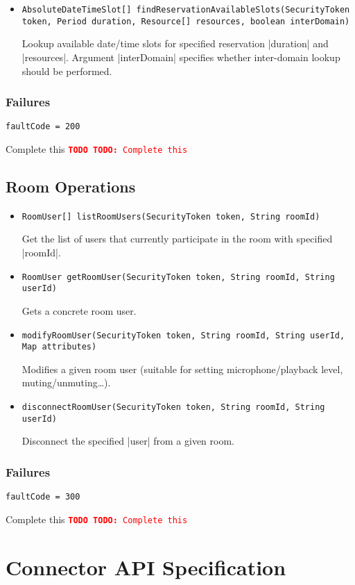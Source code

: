 \documentclass[a4paper]{report}
\newenvironment{Api}{\begin{itemize}}{\end{itemize}}
\newcommand{\ApiCode}[1]{\lstinline[style=styleApi]|#1|}
\newcommand{\ApiItem}[1]{\item #1 %

}
\newcommand{\ApiCmd}[1]{\ApiItem{\ApiCode{#1}}}
\newenvironment{ApiFailures}{\begin{compactitem}}{\end{compactitem}}
\newcommand{\ApiFailure}[1]{\ApiItem{\ApiCode{faultCode = #1}}}
\newcommand{\TODO}[1]{%
\def\empty{}%
\def\prvniparametr{#1}%
\ifx\prvniparametr\empty%
\begingroup\tt\textcolor{red}{\noindent\textbf{TODO}}\endgroup
\else%
\begingroup\tt\textcolor{red}{\noindent\textbf{TODO:}\ #1}\endgroup
\fi%
}
\begin{document}
\begin{Api}
\ApiCmd{AbsoluteDateTimeSlot[] findReservationAvailableSlots(SecurityToken token, Period duration, Resource[] resources, boolean interDomain)}
Lookup available date/time slots for specified reservation |duration| and |resources|. Argument |interDomain| specifies whether inter-domain lookup should be performed.

\end{Api}

\subsection{Failures}

\begin{ApiFailures}
\ApiFailure{200} 
\end{ApiFailures}
\TODO{Complete this}


\section{Room Operations}

\begin{Api}

\ApiCmd{RoomUser[] listRoomUsers(SecurityToken token, String roomId)}
Get the list of users that currently participate in the room with specified |roomId|.

\ApiCmd{RoomUser getRoomUser(SecurityToken token, String roomId, String userId)}
Gets a concrete room user.

\ApiCmd{modifyRoomUser(SecurityToken token, String roomId, String userId, Map attributes)}
Modifies a given room user (suitable for setting microphone/playback level, muting/unmuting\ldots).

\ApiCmd{disconnectRoomUser(SecurityToken token, String roomId, String userId)}
Disconnect the specified |user| from a given room.

\end{Api}

\subsection{Failures}

\begin{ApiFailures}
\ApiFailure{300} 
\end{ApiFailures}
\TODO{Complete this}


\chapter{Connector API Specification}
\end{document}
